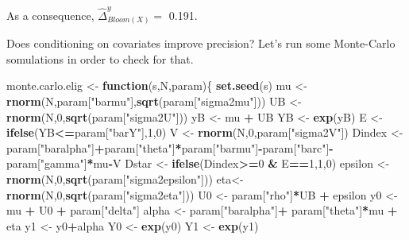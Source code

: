 \documentclass[]{book}
\newenvironment{Shaded}{\begin{snugshade}}{\end{snugshade}}
\newcommand{\KeywordTok}[1]{\textcolor[rgb]{0.13,0.29,0.53}{\textbf{#1}}}
\newcommand{\DecValTok}[1]{\textcolor[rgb]{0.00,0.00,0.81}{#1}}
\newcommand{\StringTok}[1]{\textcolor[rgb]{0.31,0.60,0.02}{#1}}
\newcommand{\ControlFlowTok}[1]{\textcolor[rgb]{0.13,0.29,0.53}{\textbf{#1}}}
\newcommand{\OperatorTok}[1]{\textcolor[rgb]{0.81,0.36,0.00}{\textbf{#1}}}
\newcommand{\NormalTok}[1]{#1}
\theoremstyle{definition}
\theoremstyle{definition}
\theoremstyle{definition}
\theoremstyle{remark}
\begin{document}
As a consequence, \(\hat{\Delta}^y_{Bloom(X)}=\) 0.191.

Does conditioning on covariates improve precision? Let's run some
Monte-Carlo somulations in order to check for that.

\begin{Shaded}
\begin{Highlighting}[]
\NormalTok{monte.carlo.elig <-}\StringTok{ }\ControlFlowTok{function}\NormalTok{(s,N,param)\{}
  \KeywordTok{set.seed}\NormalTok{(s)}
\NormalTok{  mu <-}\StringTok{ }\KeywordTok{rnorm}\NormalTok{(N,param[}\StringTok{"barmu"}\NormalTok{],}\KeywordTok{sqrt}\NormalTok{(param[}\StringTok{"sigma2mu"}\NormalTok{]))}
\NormalTok{  UB <-}\StringTok{ }\KeywordTok{rnorm}\NormalTok{(N,}\DecValTok{0}\NormalTok{,}\KeywordTok{sqrt}\NormalTok{(param[}\StringTok{"sigma2U"}\NormalTok{]))}
\NormalTok{  yB <-}\StringTok{ }\NormalTok{mu }\OperatorTok{+}\StringTok{ }\NormalTok{UB }
\NormalTok{  YB <-}\StringTok{ }\KeywordTok{exp}\NormalTok{(yB)}
\NormalTok{  E <-}\StringTok{ }\KeywordTok{ifelse}\NormalTok{(YB}\OperatorTok{<=}\NormalTok{param[}\StringTok{"barY"}\NormalTok{],}\DecValTok{1}\NormalTok{,}\DecValTok{0}\NormalTok{)}
\NormalTok{  V <-}\StringTok{ }\KeywordTok{rnorm}\NormalTok{(N,}\DecValTok{0}\NormalTok{,param[}\StringTok{"sigma2V"}\NormalTok{])}
\NormalTok{  Dindex <-}\StringTok{ }\NormalTok{param[}\StringTok{"baralpha"}\NormalTok{]}\OperatorTok{+}\NormalTok{param[}\StringTok{"theta"}\NormalTok{]}\OperatorTok{*}\NormalTok{param[}\StringTok{"barmu"}\NormalTok{]}\OperatorTok{-}\NormalTok{param[}\StringTok{"barc"}\NormalTok{]}\OperatorTok{-}\NormalTok{param[}\StringTok{"gamma"}\NormalTok{]}\OperatorTok{*}\NormalTok{mu}\OperatorTok{-}\NormalTok{V}
\NormalTok{  Dstar <-}\StringTok{ }\KeywordTok{ifelse}\NormalTok{(Dindex}\OperatorTok{>=}\DecValTok{0} \OperatorTok{&}\StringTok{ }\NormalTok{E}\OperatorTok{==}\DecValTok{1}\NormalTok{,}\DecValTok{1}\NormalTok{,}\DecValTok{0}\NormalTok{)}
\NormalTok{  epsilon <-}\StringTok{ }\KeywordTok{rnorm}\NormalTok{(N,}\DecValTok{0}\NormalTok{,}\KeywordTok{sqrt}\NormalTok{(param[}\StringTok{"sigma2epsilon"}\NormalTok{]))}
\NormalTok{  eta<-}\StringTok{ }\KeywordTok{rnorm}\NormalTok{(N,}\DecValTok{0}\NormalTok{,}\KeywordTok{sqrt}\NormalTok{(param[}\StringTok{"sigma2eta"}\NormalTok{]))}
\NormalTok{  U0 <-}\StringTok{ }\NormalTok{param[}\StringTok{"rho"}\NormalTok{]}\OperatorTok{*}\NormalTok{UB }\OperatorTok{+}\StringTok{ }\NormalTok{epsilon}
\NormalTok{  y0 <-}\StringTok{ }\NormalTok{mu }\OperatorTok{+}\StringTok{  }\NormalTok{U0 }\OperatorTok{+}\StringTok{ }\NormalTok{param[}\StringTok{"delta"}\NormalTok{]}
\NormalTok{  alpha <-}\StringTok{ }\NormalTok{param[}\StringTok{"baralpha"}\NormalTok{]}\OperatorTok{+}\StringTok{  }\NormalTok{param[}\StringTok{"theta"}\NormalTok{]}\OperatorTok{*}\NormalTok{mu }\OperatorTok{+}\StringTok{ }\NormalTok{eta}
\NormalTok{  y1 <-}\StringTok{ }\NormalTok{y0}\OperatorTok{+}\NormalTok{alpha}
\NormalTok{  Y0 <-}\StringTok{ }\KeywordTok{exp}\NormalTok{(y0)}
\NormalTok{  Y1 <-}\StringTok{ }\KeywordTok{exp}\NormalTok{(y1)}
  

\end{Highlighting}
\end{Shaded}
\end{document}
